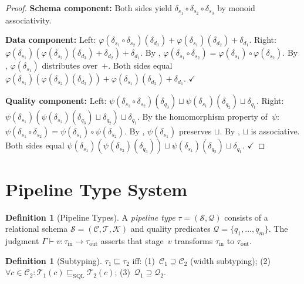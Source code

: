 \documentclass[11pt,a4paper]{article}
\theoremstyle{definition}
\newtheorem{definition}[theorem]{Definition}
\begin{document}
\begin{proof}
\textbf{Schema component:} Both sides yield
$\delta_{s_1} \circ \delta_{s_2} \circ \delta_{s_3}$ by monoid associativity.

\textbf{Data component:} Left:
$\varphi(\delta_{s_1} \circ \delta_{s_2})(\delta_{d_3})
+ \varphi(\delta_{s_1})(\delta_{d_2}) + \delta_{d_1}$.
Right:
$\varphi(\delta_{s_1})(\varphi(\delta_{s_2})(\delta_{d_3}) + \delta_{d_2})
+ \delta_{d_1}$.
By ,
$\varphi(\delta_{s_1} \circ \delta_{s_2}) = \varphi(\delta_{s_1}) \circ
\varphi(\delta_{s_2})$.
By ,
$\varphi(\delta_{s_1})$ distributes over~$+$.
Both sides equal
$\varphi(\delta_{s_1})(\varphi(\delta_{s_2})(\delta_{d_3}))
+ \varphi(\delta_{s_1})(\delta_{d_2}) + \delta_{d_1}$. $\checkmark$

\textbf{Quality component:} Left:
$\psi(\delta_{s_1} \circ \delta_{s_2})(\delta_{q_3})
\sqcup \psi(\delta_{s_1})(\delta_{q_2}) \sqcup \delta_{q_1}$.
Right:
$\psi(\delta_{s_1})(\psi(\delta_{s_2})(\delta_{q_3}) \sqcup \delta_{q_2})
\sqcup \delta_{q_1}$.
By the homomorphism property of~$\psi$:
$\psi(\delta_{s_1} \circ \delta_{s_2}) = \psi(\delta_{s_1}) \circ \psi(\delta_{s_2})$.
By , $\psi(\delta_{s_1})$ preserves $\sqcup$.
By , $\sqcup$ is associative.
Both sides equal
$\psi(\delta_{s_1})(\psi(\delta_{s_2})(\delta_{q_3}))
\sqcup \psi(\delta_{s_1})(\delta_{q_2}) \sqcup \delta_{q_1}$. $\checkmark$
\end{proof}


\section{Pipeline Type System}
\label{sec:type-system}

\begin{definition}[Pipeline Types]\label{def:pipeline-types}
A \emph{pipeline type} $\tau = (\mathcal{S}, \mathcal{Q})$ consists of a
relational schema $\mathcal{S} = (\mathcal{C}, \mathcal{T}, \mathcal{K})$
and quality predicates $\mathcal{Q} = \{q_1, \ldots, q_m\}$.
The judgment $\Gamma \vdash v : \tau_{\mathrm{in}} \to \tau_{\mathrm{out}}$
asserts that stage~$v$ transforms $\tau_{\mathrm{in}}$ to $\tau_{\mathrm{out}}$.
\end{definition}

\begin{definition}[Subtyping]\label{def:subtyping}
$\tau_1 \sqsubseteq \tau_2$ iff:
(1)~$\mathcal{C}_1 \supseteq \mathcal{C}_2$ (width subtyping);
(2)~$\forall c \in \mathcal{C}_2: \mathcal{T}_1(c) \sqsubseteq_{\mathrm{SQL}} \mathcal{T}_2(c)$;
(3)~$\mathcal{Q}_1 \supseteq \mathcal{Q}_2$.
\end{definition}
\end{document}
